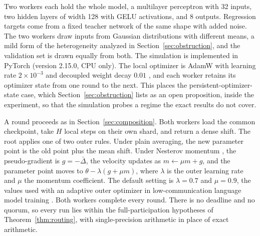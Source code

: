 \documentclass[11pt]{article}
\theoremstyle{definition}
\theoremstyle{remark}
\begin{document}
Two workers each hold the whole model, a multilayer perceptron with 32 inputs, two hidden layers of width 128 with GELU activations, and 8 outputs. Regression targets come from a fixed teacher network of the same shape with added noise. The two workers draw inputs from Gaussian distributions with different means, a mild form of the heterogeneity analyzed in Section~\ref{sec:obstruction}, and the validation set is drawn equally from both. The simulation is implemented in PyTorch (version 2.15.0, CPU only). The local optimizer is AdamW with learning rate $2\times10^{-3}$ and decoupled weight decay $0.01$ \cite{loshchilov2019}, and each worker retains its optimizer state from one round to the next. This places the persistent-optimizer-state case, which Section~\ref{sec:obstruction} lists as an open proposition, inside the experiment, so that the simulation probes a regime the exact results do not cover.

A round proceeds as in Section~\ref{sec:composition}. Both workers load the common checkpoint, take $H$ local steps on their own shard, and return a dense shift. The root applies one of two outer rules. Under plain averaging, the new parameter point is the old point plus the mean shift. Under Nesterov momentum \cite{nesterov1983}, the pseudo-gradient is $g=-\bar\Delta$, the velocity updates as $m\leftarrow\mu m+g$, and the parameter point moves to $\theta-\lambda(g+\mu m)$, where $\lambda$ is the outer learning rate and $\mu$ the momentum coefficient. The default setting is $\lambda=0.7$ and $\mu=0.9$, the values used with an adaptive outer optimizer in low-communication language model training \cite{douillard2023}. Both workers complete every round. There is no deadline and no quorum, so every run lies within the full-participation hypotheses of Theorem~\ref{thm:routing}, with single-precision arithmetic in place of exact arithmetic.
\end{document}
